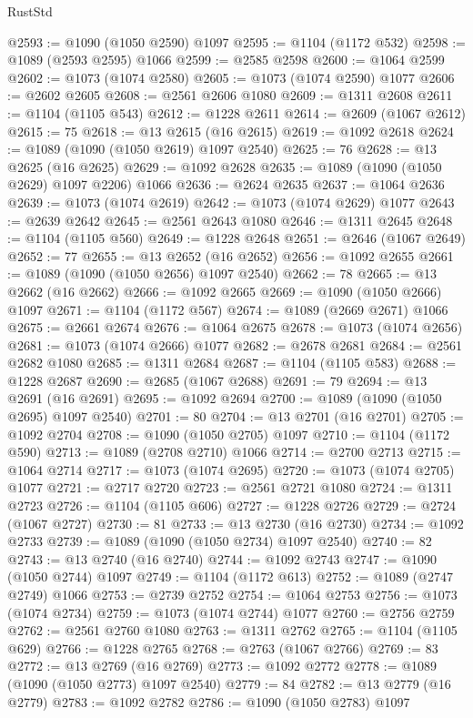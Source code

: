 \begin{lexlean}{RustStd}
\begin{coremodule}
@2593 := @1090 (@1050 @2590) @1097
@2595 := @1104 (@1172 @532)
@2598 := @1089 (@2593 @2595) @1066
@2599 := @2585 @2598
@2600 := @1064 @2599
@2602 := @1073 (@1074 @2580)
@2605 := @1073 (@1074 @2590) @1077
@2606 := @2602 @2605
@2608 := @2561 @2606 @1080
@2609 := @1311 @2608
@2611 := @1104 (@1105 @543)
@2612 := @1228 @2611
@2614 := @2609 (@1067 @2612)
@2615 := 75
@2618 := @13 @2615 (@16 @2615)
@2619 := @1092 @2618
@2624 := @1089 (@1090 (@1050 @2619) @1097 @2540)
@2625 := 76
@2628 := @13 @2625 (@16 @2625)
@2629 := @1092 @2628
@2635 := @1089 (@1090 (@1050 @2629) @1097 @2206) @1066
@2636 := @2624 @2635
@2637 := @1064 @2636
@2639 := @1073 (@1074 @2619)
@2642 := @1073 (@1074 @2629) @1077
@2643 := @2639 @2642
@2645 := @2561 @2643 @1080
@2646 := @1311 @2645
@2648 := @1104 (@1105 @560)
@2649 := @1228 @2648
@2651 := @2646 (@1067 @2649)
@2652 := 77
@2655 := @13 @2652 (@16 @2652)
@2656 := @1092 @2655
@2661 := @1089 (@1090 (@1050 @2656) @1097 @2540)
@2662 := 78
@2665 := @13 @2662 (@16 @2662)
@2666 := @1092 @2665
@2669 := @1090 (@1050 @2666) @1097
@2671 := @1104 (@1172 @567)
@2674 := @1089 (@2669 @2671) @1066
@2675 := @2661 @2674
@2676 := @1064 @2675
@2678 := @1073 (@1074 @2656)
@2681 := @1073 (@1074 @2666) @1077
@2682 := @2678 @2681
@2684 := @2561 @2682 @1080
@2685 := @1311 @2684
@2687 := @1104 (@1105 @583)
@2688 := @1228 @2687
@2690 := @2685 (@1067 @2688)
@2691 := 79
@2694 := @13 @2691 (@16 @2691)
@2695 := @1092 @2694
@2700 := @1089 (@1090 (@1050 @2695) @1097 @2540)
@2701 := 80
@2704 := @13 @2701 (@16 @2701)
@2705 := @1092 @2704
@2708 := @1090 (@1050 @2705) @1097
@2710 := @1104 (@1172 @590)
@2713 := @1089 (@2708 @2710) @1066
@2714 := @2700 @2713
@2715 := @1064 @2714
@2717 := @1073 (@1074 @2695)
@2720 := @1073 (@1074 @2705) @1077
@2721 := @2717 @2720
@2723 := @2561 @2721 @1080
@2724 := @1311 @2723
@2726 := @1104 (@1105 @606)
@2727 := @1228 @2726
@2729 := @2724 (@1067 @2727)
@2730 := 81
@2733 := @13 @2730 (@16 @2730)
@2734 := @1092 @2733
@2739 := @1089 (@1090 (@1050 @2734) @1097 @2540)
@2740 := 82
@2743 := @13 @2740 (@16 @2740)
@2744 := @1092 @2743
@2747 := @1090 (@1050 @2744) @1097
@2749 := @1104 (@1172 @613)
@2752 := @1089 (@2747 @2749) @1066
@2753 := @2739 @2752
@2754 := @1064 @2753
@2756 := @1073 (@1074 @2734)
@2759 := @1073 (@1074 @2744) @1077
@2760 := @2756 @2759
@2762 := @2561 @2760 @1080
@2763 := @1311 @2762
@2765 := @1104 (@1105 @629)
@2766 := @1228 @2765
@2768 := @2763 (@1067 @2766)
@2769 := 83
@2772 := @13 @2769 (@16 @2769)
@2773 := @1092 @2772
@2778 := @1089 (@1090 (@1050 @2773) @1097 @2540)
@2779 := 84
@2782 := @13 @2779 (@16 @2779)
@2783 := @1092 @2782
@2786 := @1090 (@1050 @2783) @1097

\end{coremodule}
\end{lexlean}

